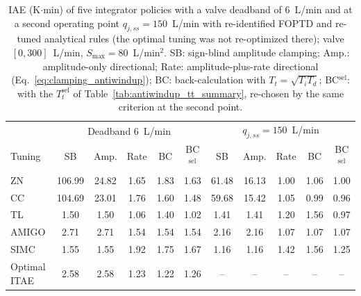 \begin{table}[t]
\centering
\footnotesize
\setlength{\tabcolsep}{3pt}
\caption{IAE (K$\cdot$min) of five integrator policies with a valve deadband of $6$~L/min and at a second operating point $q_{j,ss} = 150$~L/min with re-identified FOPTD and re-tuned analytical rules (the optimal tuning was not re-optimized there); valve $[0, 300]$~L/min, $S_{\max} = 80$~L/min$^2$. SB: sign-blind amplitude clamping; Amp.: amplitude-only directional; Rate: amplitude-plus-rate directional (Eq.~\eqref{eq:clamping_antiwindup}); BC: back-calculation with $T_t = \sqrt{T_iT_d}$; BC$^{\mathrm{sel}}$: with the $T_t^{\mathrm{sel}}$ of Table~\ref{tab:antiwindup_tt_summary}, re-chosen by the same criterion at the second point.}
\label{tab:robustness_ext}
\begin{tabular}{lcccccccccc}
\toprule
 & \multicolumn{5}{c}{Deadband $6$~L/min} & \multicolumn{5}{c}{$q_{j,ss} = 150$~L/min} \\
Tuning & SB & Amp. & Rate & BC & BC$^{\mathrm{sel}}$ & SB & Amp. & Rate & BC & BC$^{\mathrm{sel}}$ \\
\midrule
ZN & 106.99 & 24.82 & 1.65 & 1.83 & 1.63 & 61.48 & 16.13 & 1.00 & 1.06 & 1.00 \\
CC & 104.69 & 23.01 & 1.76 & 1.60 & 1.48 & 59.68 & 15.42 & 1.05 & 0.99 & 0.96 \\
TL & 1.50 & 1.50 & 1.06 & 1.40 & 1.02 & 1.41 & 1.41 & 1.20 & 1.56 & 0.97 \\
AMIGO & 2.71 & 2.71 & 1.54 & 1.54 & 1.54 & 2.16 & 2.16 & 1.07 & 1.07 & 1.07 \\
SIMC & 1.55 & 1.55 & 1.92 & 1.75 & 1.67 & 1.16 & 1.16 & 1.42 & 1.56 & 1.25 \\
Optimal ITAE & 2.58 & 2.58 & 1.23 & 1.22 & 1.26 & -- & -- & -- & -- & -- \\
\bottomrule
\end{tabular}
\end{table}
